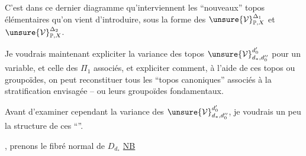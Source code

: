 C'est dans ce dernier diagramme qu'interviennent les ``nouveaux'' topos élémentaires qu'on vient d'introduire, sous la forme des $\unsure{\mathcal V}^{\Delta_1}_{\mathbb P,X}$ et $\unsure{\mathcal V}^{\Delta_2}_{\mathbb P,X}$.

Je voudrais maintenant expliciter la variance des topos $\unsure{\mathcal V}^{d'_0}_{d_*,d''_0}$ pour un  variable, et celle des $\Pi_1$ associés, et expliciter comment, à l'aide de ces topos ou groupoïdes, on peut reconstituer tous les ``topos canoniques'' associés à la stratification envisagée -- ou leurs groupoïdes fondamentaux.

Avant  d'examiner cependant la variance des $\unsure{\mathcal V}^{d'_0}_{d_*,d''_0}$, je voudrais  un peu la structure de ces ``''.

, prenons le fibré normal de $D_{d_*}$ 
\deleted{\[
(282)\qquad\check N_{d_*,d''_0}\overset{\mathrm{def}}=\check N_{D_{d_*},D_{d''_0}}\qquad\uline{\text{fibré normal}}
\]}
\uline{NB}
